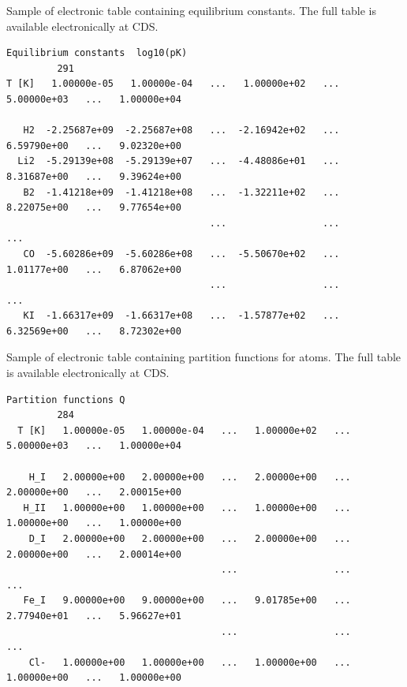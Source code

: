 \documentclass[traditabstract]{aa} %
\begin{document}
\begin{table}
\begin{center}
\caption{Sample of electronic table containing equilibrium constants. The full table is available electronically at CDS.}
\label{tab:equil}
\scriptsize
\begin{verbatim} 
Equilibrium constants  log10(pK)
         291
T [K]   1.00000e-05   1.00000e-04   ...   1.00000e+02   ...   5.00000e+03   ...   1.00000e+04
   
   H2  -2.25687e+09  -2.25687e+08   ...  -2.16942e+02   ...   6.59790e+00   ...   9.02320e+00
  Li2  -5.29139e+08  -5.29139e+07   ...  -4.48086e+01   ...   8.31687e+00   ...   9.39624e+00
   B2  -1.41218e+09  -1.41218e+08   ...  -1.32211e+02   ...   8.22075e+00   ...   9.77654e+00
                                    ...                 ...                 ...
   CO  -5.60286e+09  -5.60286e+08   ...  -5.50670e+02   ...   1.01177e+00   ...   6.87062e+00
                                    ...                 ...                 ...
   KI  -1.66317e+09  -1.66317e+08   ...  -1.57877e+02   ...   6.32569e+00   ...   8.72302e+00

\end{verbatim}
\end{center}
\end{table} 

\begin{table}
\begin{center}
\caption{Sample of electronic table containing partition functions for atoms. The full table is available electronically at CDS.}
\label{tab:atompartf}
\scriptsize
\begin{verbatim}
Partition functions Q
         284
  T [K]   1.00000e-05   1.00000e-04   ...   1.00000e+02   ...   5.00000e+03   ...   1.00000e+04
 
    H_I   2.00000e+00   2.00000e+00   ...   2.00000e+00   ...   2.00000e+00   ...   2.00015e+00
   H_II   1.00000e+00   1.00000e+00   ...   1.00000e+00   ...   1.00000e+00   ...   1.00000e+00
    D_I   2.00000e+00   2.00000e+00   ...   2.00000e+00   ...   2.00000e+00   ...   2.00014e+00
                                      ...                 ...                 ...    
   Fe_I   9.00000e+00   9.00000e+00   ...   9.01785e+00   ...   2.77940e+01   ...   5.96627e+01
                                      ...                 ...                 ...
    Cl-   1.00000e+00   1.00000e+00   ...   1.00000e+00   ...   1.00000e+00   ...   1.00000e+00
\end{verbatim}
\end{center}
\end{table} 
\end{document}
